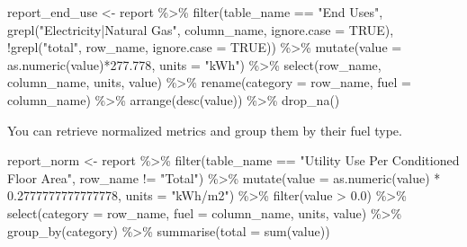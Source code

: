 \documentclass[
]{book}
\newenvironment{Shaded}{\begin{snugshade}}{\end{snugshade}}
\newcommand{\AttributeTok}[1]{\textcolor[rgb]{0.77,0.63,0.00}{#1}}
\newcommand{\ConstantTok}[1]{\textcolor[rgb]{0.00,0.00,0.00}{#1}}
\newcommand{\FloatTok}[1]{\textcolor[rgb]{0.00,0.00,0.81}{#1}}
\newcommand{\FunctionTok}[1]{\textcolor[rgb]{0.00,0.00,0.00}{#1}}
\newcommand{\NormalTok}[1]{#1}
\newcommand{\OtherTok}[1]{\textcolor[rgb]{0.56,0.35,0.01}{#1}}
\newcommand{\SpecialCharTok}[1]{\textcolor[rgb]{0.00,0.00,0.00}{#1}}
\newcommand{\StringTok}[1]{\textcolor[rgb]{0.31,0.60,0.02}{#1}}
\begin{document}
\begin{Shaded}
\begin{Highlighting}[]
\NormalTok{report\_end\_use }\OtherTok{\textless{}{-}}\NormalTok{ report }\SpecialCharTok{\%\textgreater{}\%}
    \FunctionTok{filter}\NormalTok{(table\_name }\SpecialCharTok{==} \StringTok{"End Uses"}\NormalTok{, }
           \FunctionTok{grepl}\NormalTok{(}\StringTok{"Electricity|Natural Gas"}\NormalTok{, column\_name, }\AttributeTok{ignore.case =} \ConstantTok{TRUE}\NormalTok{),}
           \SpecialCharTok{!}\FunctionTok{grepl}\NormalTok{(}\StringTok{"total"}\NormalTok{, row\_name, }\AttributeTok{ignore.case =} \ConstantTok{TRUE}\NormalTok{)) }\SpecialCharTok{\%\textgreater{}\%}
    \FunctionTok{mutate}\NormalTok{(}\AttributeTok{value =} \FunctionTok{as.numeric}\NormalTok{(value)}\SpecialCharTok{*}\FloatTok{277.778}\NormalTok{,}
           \AttributeTok{units =} \StringTok{"kWh"}\NormalTok{) }\SpecialCharTok{\%\textgreater{}\%}
    \FunctionTok{select}\NormalTok{(row\_name, column\_name, units, value) }\SpecialCharTok{\%\textgreater{}\%}
    \FunctionTok{rename}\NormalTok{(}\AttributeTok{category =}\NormalTok{ row\_name, }\AttributeTok{fuel =}\NormalTok{ column\_name) }\SpecialCharTok{\%\textgreater{}\%}
    \FunctionTok{arrange}\NormalTok{(}\FunctionTok{desc}\NormalTok{(value)) }\SpecialCharTok{\%\textgreater{}\%}
    \FunctionTok{drop\_na}\NormalTok{()}
\end{Highlighting}
\end{Shaded}

You can retrieve normalized metrics and group them by their fuel type.

\begin{Shaded}
\begin{Highlighting}[]
\NormalTok{report\_norm }\OtherTok{\textless{}{-}}\NormalTok{ report }\SpecialCharTok{\%\textgreater{}\%}
    \FunctionTok{filter}\NormalTok{(table\_name }\SpecialCharTok{==} \StringTok{"Utility Use Per Conditioned Floor Area"}\NormalTok{,}
\NormalTok{           row\_name }\SpecialCharTok{!=} \StringTok{"Total"}\NormalTok{) }\SpecialCharTok{\%\textgreater{}\%}
    \FunctionTok{mutate}\NormalTok{(}\AttributeTok{value =} \FunctionTok{as.numeric}\NormalTok{(value) }\SpecialCharTok{*} \FloatTok{0.2777777777777778}\NormalTok{,}
           \AttributeTok{units =} \StringTok{"kWh/m2"}\NormalTok{) }\SpecialCharTok{\%\textgreater{}\%}
    \FunctionTok{filter}\NormalTok{(value }\SpecialCharTok{\textgreater{}} \FloatTok{0.0}\NormalTok{) }\SpecialCharTok{\%\textgreater{}\%}
    \FunctionTok{select}\NormalTok{(}\AttributeTok{category =}\NormalTok{ row\_name, }\AttributeTok{fuel =}\NormalTok{ column\_name, units, value) }\SpecialCharTok{\%\textgreater{}\%}
    \FunctionTok{group\_by}\NormalTok{(category) }\SpecialCharTok{\%\textgreater{}\%}
    \FunctionTok{summarise}\NormalTok{(}\AttributeTok{total =} \FunctionTok{sum}\NormalTok{(value))}
\end{Highlighting}
\end{Shaded}
\end{document}

